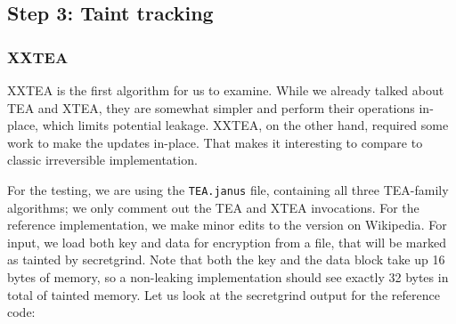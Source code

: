 \documentclass[a4paper,10pt,openright]{memoir}
\newcommand{\code}[1]{\texttt{#1}}
\begin{document}
\subsection{Step 3: Taint tracking}

\subsubsection{XXTEA}

XXTEA is the first algorithm for us to examine. While we already talked 
about TEA and XTEA, they are somewhat simpler and perform their 
operations in-place, which limits potential leakage. XXTEA, on the 
other hand, required some work to make the updates in-place. That makes 
it interesting to compare to classic irreversible implementation.

For the testing, we are using the \code{TEA.janus} file, containing all 
three TEA-family algorithms; we only comment out the TEA and XTEA 
invocations. For the reference implementation, we make minor edits to 
the version on Wikipedia\cite{xxtea-wiki}. For input, we load 
both key and data for encryption from a file, that will be marked as 
tainted by secretgrind. Note that both the key and the data 
block take up 16 bytes of memory, so a non-leaking implementation 
should see exactly 32 bytes in total of tainted memory. Let us look at 
the secretgrind output for the reference code:
\end{document}
